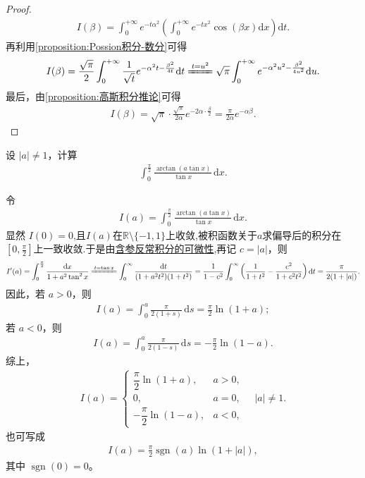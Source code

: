 \documentclass[../../main.tex]{subfiles}%
\begin{document}
\begin{proof}
\begin{align*}
I(\beta) = \int_{0}^{+\infty} e^{-t\alpha^2} \left( \int_{0}^{+\infty} e^{-t x^2} \cos(\beta x) \mathrm{d}x \right) \mathrm{d}t.
\end{align*}
再利用\cref{proposition:Possion积分-数分}可得
\begin{align*}
I(\beta) = \frac{\sqrt{\pi}}{2} \int_{0}^{+\infty} \frac{1}{\sqrt{t}} e^{-\alpha^2 t - \frac{\beta^2}{4t}} \mathrm{d}t \xlongequal{t=u^2}\sqrt{\pi}\int_0^{+\infty}{e^{-\alpha ^2u^2-\frac{\beta ^2}{4u^2}}\mathrm{d}u}.
\end{align*}
最后，由\cref{proposition:高斯积分推论}可得
\begin{align*}
I(\beta) = \sqrt{\pi} \cdot \frac{\sqrt{\pi}}{2\alpha} e^{-2\alpha \cdot \frac{\beta}{2}}
= \frac{\pi}{2\alpha} e^{-\alpha\beta}. 
\end{align*}
\end{proof}

\begin{example}
设 $|a| \neq 1$，计算
\begin{align*}
\int_{0}^{\frac{\pi}{2}} \frac{\arctan(a \tan x)}{\tan x} \, \mathrm{d}x.
\end{align*}
\end{example}
\begin{solution}
令
\begin{align*}
I(a)=\int_{0}^{\frac{\pi}{2}}\frac{\arctan(a\tan x)}{\tan x}\,\mathrm{d}x.
\end{align*}
显然 $I(0)=0$,且$I(a)$在$\mathbb{R}\setminus \{-1,1\}$上收敛,被积函数关于$a$求偏导后的积分在$[0,\frac{\pi}{2}]$上一致收敛.于是由\hyperref[theorem:含参反常积分的可微性]{含参反常积分的可微性},再记 $c=|a|$，则
\begin{align*}
I' (a)=\int_0^{\frac{\pi}{2}}{\frac{\mathrm{d}x}{1+a^2\tan ^2x}}\xlongequal{t=\tan x}\int_0^{\infty}{\frac{\mathrm{d}t}{(1+a^2t^2)(1+t^2)}}=\frac{1}{1-c^2}\int_0^{\infty}{\left( \frac{1}{1+t^2}-\frac{c^2}{1+c^2t^2} \right) \mathrm{d}t}=\frac{\pi}{2(1+|a|)}.
\end{align*}
因此，若 $a>0$，则
\begin{align*}
I(a)=\int_{0}^{a}\frac{\pi}{2(1+s)}\,\mathrm{d}s
=\frac{\pi}{2}\ln(1+a);
\end{align*}
若 $a<0$，则
\begin{align*}
I(a)=\int_{0}^{a}\frac{\pi}{2(1-s)}\,\mathrm{d}s
=-\frac{\pi}{2}\ln(1-a).
\end{align*}
综上，
\begin{align*}
I(a)=
\begin{cases}
\dfrac{\pi}{2}\ln(1+a), & a>0,\\[6pt]
0, & a=0,\\[6pt]
-\dfrac{\pi}{2}\ln(1-a), & a<0,
\end{cases}
\quad |a|\neq 1.
\end{align*}
也可写成
\begin{align*}
I(a)=\frac{\pi}{2}\operatorname{sgn}(a)\ln(1+|a|),
\end{align*}
其中 $\operatorname{sgn}(0)=0$。
\end{solution}
\end{document}
